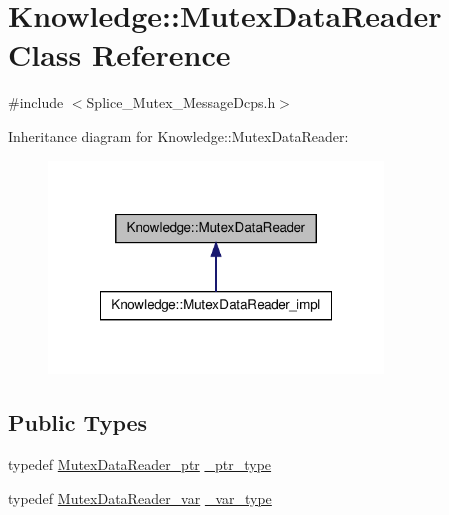 \hypertarget{classKnowledge_1_1MutexDataReader}{
\section{Knowledge::MutexDataReader Class Reference}
\label{dc/d57/classKnowledge_1_1MutexDataReader}
}


{\ttfamily \#include $<$Splice\_\-Mutex\_\-MessageDcps.h$>$}



Inheritance diagram for Knowledge::MutexDataReader:
\nopagebreak
\begin{figure}[H]
\begin{center}
\leavevmode
\includegraphics[width=252pt]{db/d38/classKnowledge_1_1MutexDataReader__inherit__graph}
\end{center}
\end{figure}
\subsection*{Public Types}
\begin{DoxyCompactItemize}
\item 
typedef \hyperlink{classKnowledge_1_1MutexDataReader}{MutexDataReader\_\-ptr} \hyperlink{classKnowledge_1_1MutexDataReader_a6ce4984d18dc73062308b9481f58d1d9}{\_\-ptr\_\-type}
\item 
typedef \hyperlink{namespaceKnowledge_a1af3d1f19c7cf91384b3fb2a37b3258b}{MutexDataReader\_\-var} \hyperlink{classKnowledge_1_1MutexDataReader_a2105a46860f8e7bf371ca6275bcdc8b4}{\_\-var\_\-type}
\end{DoxyCompactItemize}

